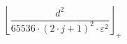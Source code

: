 \[\left\lfloor \frac{d^{2}}{65536 \cdot \left(2 \cdot j + 1\right)^{2} \cdot \varepsilon^{2}} \right\rfloor_{+}\]
